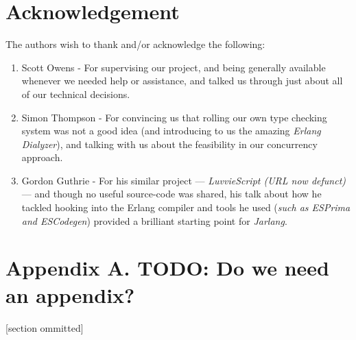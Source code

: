 \documentclass[twoside,12pt,titlepage,a4paper]{article}
\begin{document}
\section{Acknowledgement}
The authors wish to thank and/or acknowledge the following:
\begin{enumerate}
\item Scott Owens - For supervising our project, and being generally available whenever we needed help or assistance, and talked us through just about all of our technical decisions.
\item Simon Thompson - For convincing us that rolling our own type checking system was not a good idea (and introducing to us the amazing \textit{Erlang Dialyzer}), and talking with us about the feasibility in our concurrency approach.
\item Gordon Guthrie - For his similar project --- \textit{LuvvieScript (URL now defunct)} --- and though no useful source-code was shared, his talk about how he tackled hooking into the Erlang compiler and tools he used (\textit{such as ESPrima and ESCodegen}) provided a brilliant starting point for \textit{Jarlang}.
\end{enumerate}
\appendix
\section*{Appendix A. TODO: Do we need an appendix?}


[section ommitted]



\vskip 0.2in


\end{document}
